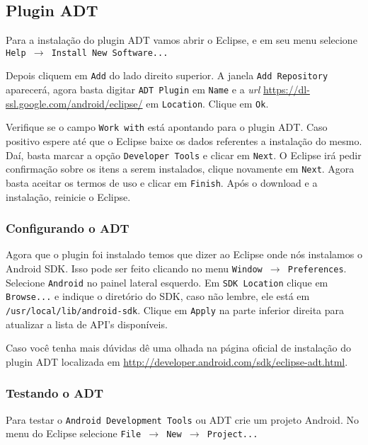 \subsection{Plugin ADT}

Para a instalação do plugin ADT vamos abrir o Eclipse, e em seu menu selecione \texttt{Help $\rightarrow$
Install New Software...}

Depois cliquem em \texttt{Add} do lado direito superior. A janela \texttt{Add Repository} aparecerá,
agora basta digitar \texttt{ADT Plugin} em \texttt{Name} e a \textit{url}
\url{https://dl-ssl.google.com/android/eclipse/} em \texttt{Location}. Clique em \texttt{Ok}.

Verifique se o campo \texttt{Work with} está apontando para o plugin ADT. Caso positivo espere até que
o Eclipse baixe os dados referentes a instalação do mesmo. Daí, basta marcar a opção
\texttt{Developer Tools} e clicar em \texttt{Next}. O Eclipse irá pedir confirmação sobre os itens
a serem instalados, clique novamente em \texttt{Next}. Agora basta aceitar os termos de uso e clicar em
\texttt{Finish}. Após o download e a instalação, reinicie o Eclipse.

\subsubsection{Configurando o ADT}

Agora que o plugin foi instalado temos que dizer ao Eclipse onde nós instalamos o Android SDK. Isso
pode ser feito clicando no menu \texttt{Window $\rightarrow$ Preferences}. Selecione \texttt{Android} no painel
lateral esquerdo. Em \texttt{SDK Location} clique em \texttt{Browse...} e indique o diretório do SDK,
caso não lembre, ele está em \texttt{/usr/local/lib/android-sdk}. Clique em \texttt{Apply} na parte inferior
direita para atualizar a lista de API's disponíveis.

Caso você tenha mais dúvidas dê uma olhada na página oficial de instalação do plugin ADT localizada em
\url{http://developer.android.com/sdk/eclipse-adt.html}.

\subsubsection{Testando o ADT \label{sssec:testando}}

Para testar o \texttt{Android Development Tools} ou ADT crie um projeto Android. No menu do Eclipse selecione
\texttt{File $\rightarrow$ New $\rightarrow$ Project...}

